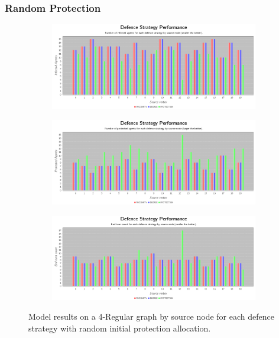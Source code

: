 \documentclass[results.tex]{subfiles}
\begin{document}
\newpage 


\subsubsection{Random Protection}



\newpage

\begin{figure}[!ht]
\centering
     \begin{subfigure}[b]{0.9\textwidth}
         \centering
         \includegraphics[width=\textwidth]{Random/RandomInfectedChart}
         \label{fig:4reg-ran-infected}
     \end{subfigure}
     \vfill
     \begin{subfigure}[b]{0.9\textwidth}
         \centering
         \includegraphics[width=\textwidth]{Random/RandomProtectedChart}
         \label{fig:4reg-ran-protected}
     \end{subfigure}
     \vfill
     \begin{subfigure}[b]{0.9\textwidth}
         \centering
         \includegraphics[width=\textwidth]{Random/RandomEndTurnChart}
         \label{fig:4reg-ran-end}
     \end{subfigure}
        \caption{Model results on a 4-Regular graph by source node for each defence strategy with random initial protection allocation.}
        \label{fig:4reg-ran-charts}
\end{figure}
\end{document}
